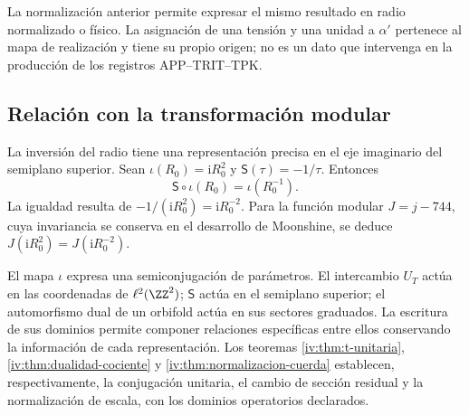 La normalización anterior permite expresar el mismo resultado en
radio normalizado o físico. La asignación de una tensión y una
unidad a \(\alpha'\) pertenece al mapa de realización y tiene
su propio origen; no es un dato que intervenga en la producción
de los registros APP--TRIT--TPK.

\subsection{Relación con la transformación modular}

La inversión del radio tiene una representación precisa en el
eje imaginario del semiplano superior. Sean
\(\iota(R_0)=\mathrm iR_0^2\) y
\(\mathsf S(\tau)=-1/\tau\). Entonces
\begin{equation}
 \mathsf S\circ\iota(R_0)=\iota(R_0^{-1}).
 \label{iv:eq:semiconjugacion-modular}
\end{equation}
La igualdad resulta de
\(-1/(\mathrm iR_0^2)=\mathrm iR_0^{-2}\). Para la función
modular \(J=j-744\), cuya invariancia se conserva en el
desarrollo de Moonshine, se deduce
\(J(\mathrm iR_0^2)=J(\mathrm iR_0^{-2})\).

El mapa \(\iota\) expresa una semiconjugación de parámetros.
El intercambio \(U_T\) actúa en las coordenadas de
\(\ell^2(\ZZ^2)\); \(\mathsf S\) actúa en el semiplano
superior; el automorfismo dual de un orbifold actúa en sus
sectores graduados. La escritura de sus dominios permite
componer relaciones específicas entre ellos conservando la
información de cada representación. Los teoremas
\ref{iv:thm:t-unitaria}, \ref{iv:thm:dualidad-cociente}
y \ref{iv:thm:normalizacion-cuerda} establecen, respectivamente,
la conjugación unitaria, el cambio de sección residual y la
normalización de escala, con los dominios operatorios declarados.
